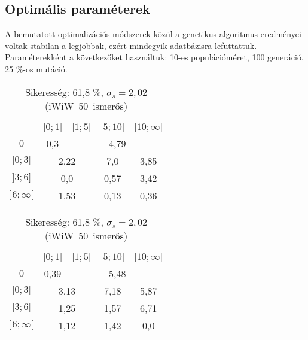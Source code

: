 \documentclass[12pt]{article}
\begin{document}
\subsection{Optimális paraméterek}
A bemutatott optimalizációs módszerek közül a genetikus algoritmus eredményei voltak stabilan a legjobbak, ezért mindegyik adatbázisra lefuttattuk. Paraméterekként a következőket használtuk: 10-es populációméret, 100 generáció, 25 \%-os mutáció.
\begin{table}[H]
	\centering
	\begin{subtable}{0.49\linewidth}
		\centering
		\captionsetup{justification=centering}
		\begin{tabular}{|c|c|c|c|c|}
			\hline
			\diagbox[width=1.5cm,height=1.2cm]{$\sigma_{cs}$}{$n_{cs}$} & $]0;1]$ & $]1;5]$ & $]5;10]$ & $]10;\infty[$  \\
			\hline
			$0$ & 0,3 & \multicolumn{3}{|c|}{4,79} \\
			\hline
			$]0;3]$ & \multicolumn{2}{|c|}{2,22} & 7,0 & 3,85 \\
			\hline
			$]3;6]$ & \multicolumn{2}{|c|}{0,0} & 0,57 & 3,42 \\
			\hline
			$]6;\infty[$  & \multicolumn{2}{|c|}{1,53} & 0,13 & 0,36 \\
			\hline
		\end{tabular}
		\caption{Sikeresség: 61,8 \%, $\sigma_s = 2,02$ \mbox{(iWiW 50 ismerős)}}
		\label{iwiw50}
	\end{subtable}
	\begin{subtable}{0.49\linewidth}
		\centering
		\captionsetup{justification=centering}
		\begin{tabular}{|c|c|c|c|c|}
			\hline
			\diagbox[width=1.5cm,height=1.2cm]{$\sigma_{cs}$}{$n_{cs}$} & $]0;1]$ & $]1;5]$ & $]5;10]$ & $]10;\infty[$  \\
			\hline
			$0$ & 0,39 & \multicolumn{3}{|c|}{5,48} \\
			\hline
			$]0;3]$ & \multicolumn{2}{|c|}{3,13} & 7,18 & 5,87 \\
			\hline
			$]3;6]$ & \multicolumn{2}{|c|}{1,25} & 1,57 & 6,71 \\
			\hline
			$]6;\infty[$  & \multicolumn{2}{|c|}{1,12} & 1,42 & 0,0 \\
			\hline

\end{tabular}
\end{subtable}
\end{table}
\end{document}
